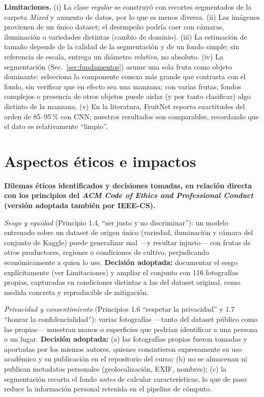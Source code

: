 \documentclass[conference]{IEEEtran}
\begin{document}
\textbf{Limitaciones.} (i) La clase \emph{regular} se construyó con recortes
segmentados de la carpeta \textit{Mixed} y aumento de datos, por lo que es menos
diversa. (ii) Las imágenes provienen de un único dataset; el desempeño podría
caer con cámaras, iluminación o variedades distintas (cambio de dominio). (iii)
La estimación de tamaño depende de la calidad de la segmentación y de un fondo
simple; sin referencia de escala, entrega un diámetro \emph{relativo}, no
absoluto. (iv) La segmentación (Sec.~\ref{sec:fundamentos}) asume una sola
fruta como objeto dominante: selecciona la componente conexa más grande que
contrasta con el fondo, sin verificar que en efecto sea una manzana; con varias
frutas, fondos complejos o presencia de otros objetos puede aislar (y por
tanto clasificar) algo distinto de la manzana. (v) En la literatura, FruitNet
reporta exactitudes del orden de
85--95\,\% con CNN; nuestros resultados son comparables, recordando que el dato
es relativamente ``limpio''.

\section{Aspectos éticos e impactos}
\label{sec:etica}
\textbf{Dilemas éticos identificados y decisiones tomadas, en relación directa
con los principios del \emph{ACM Code of Ethics and Professional
Conduct}~\cite{acm} (versión adoptada también por IEEE-CS).}

\emph{Sesgo y equidad} (Principio 1.4, ``ser justo y no discriminar''): un
modelo entrenado sobre un dataset de origen único (variedad, iluminación y
cámara del conjunto de Kaggle) puede generalizar mal —y resultar injusto— con
frutas de otros productores, regiones o condiciones de cultivo, perjudicando
económicamente a quien lo use. \textbf{Decisión adoptada:} documentar el sesgo
explícitamente (ver Limitaciones) y ampliar el conjunto con 116 fotografías
propias, capturadas en condiciones distintas a las del dataset original, como
medida concreta y reproducible de mitigación.

\emph{Privacidad y consentimiento} (Principios 1.6 ``respetar la privacidad'' y
1.7 ``honrar la confidencialidad''): varias fotografías —tanto del dataset
público como las propias— muestran manos o superficies que podrían identificar
a una persona o un lugar. \textbf{Decisión adoptada:} (a) las fotografías
propias fueron tomadas y aportadas por los mismos autores, quienes consintieron
expresamente su uso académico y su publicación en el repositorio del curso; (b)
no se almacenan ni publican metadatos personales (geolocalización, EXIF,
nombres); (c) la segmentación recorta el fondo \emph{antes} de calcular
características, lo que de paso reduce la información personal retenida en el
pipeline de cómputo.
\end{document}
